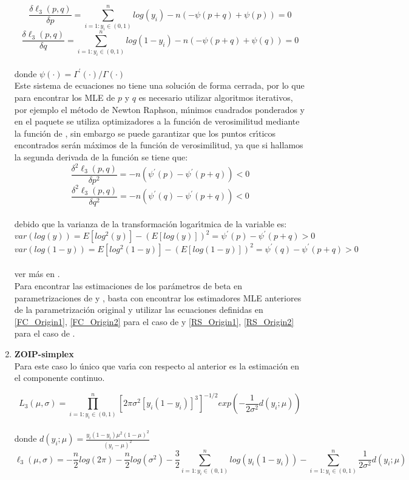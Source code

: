 \begin{enumerate}
\[
\frac{\delta \ell_3(p,q)}{\delta p}=\sum_{i=1:y_i \in (0,1)}^{n}{log(y_i)}-n(-\psi(p+q)+\psi(p))=0
\]
\[
\frac{\delta \ell_3(p,q)}{\delta q}=\sum_{i=1:y_i \in (0,1)}^{n}{log(1-y_i)}-n(-\psi(p+q)+\psi(q))=0
\]
\\
donde $\psi(\cdot)={\Gamma^{'}{(\cdot)}}/{\Gamma(\cdot)}$
\\
Este sistema de ecuaciones no tiene una soluci\'{o}n de forma cerrada, por lo que para encontrar los MLE de $p$ y $q$ es necesario utilizar algoritmos iterativos, por ejemplo el m\'{e}todo de Newton Raphson, m\'{\i}nimos cuadrados ponderados y en el paquete  se utiliza optimizadores a la funci\'{o}n de verosimilitud mediante la funci\'{o}n  de , sin embargo se puede garantizar que los puntos cr\'{\i}ticos encontrados ser\'{a}n m\'{a}ximos de la funci\'{o}n de verosimilitud, ya que si hallamos la segunda derivada de la funci\'{o}n se tiene que:
\[
\frac{\delta^2 \ell_3(p,q)}{\delta p^2}=-n(\psi^{'}(p)-\psi^{'}(p+q))<0
\]
\[
\frac{\delta^2 \ell_3(p,q)}{\delta q^2}=-n(\psi^{'}(q)-\psi^{'}(p+q))<0
\]
\\
debido que la varianza de la transformaci\'{o}n logar\'{\i}tmica de la variable es:
\[
var(log(y))=E[log^2(y)]-(E[log(y)])^2=\psi^{'}(p)-\psi^{'}(p+q)>0
\]
\[
var(log(1-y))=E[log^2(1-y)]-(E[log(1-y)])^2=\psi^{'}(q)-\psi^{'}(p+q)>0
\]
\\
ver m\'{a}s en \cite{Owen1}.\\

Para encontrar las estimaciones de los par\'{a}metros de beta en parametrizaciones de \cite{Ferrari2} y \cite{Stasinopoulos2}, basta con encontrar los estimadores MLE anteriores de la parametrizaci\'{o}n original y utilizar las ecuaciones definidas en \eqref{FC_Origin1}, \eqref{FC_Origin2} para el caso de \cite{Ferrari2} y \eqref{RS_Origin1}, \eqref{RS_Origin2} para el caso de \cite{Stasinopoulos2}.

\item \textbf{ZOIP-simplex}\\

Para este caso lo \'{u}nico que var\'{\i}a con respecto al anterior es la estimaci\'{o}n en el componente continuo.

\[
L_3(\mu,\sigma)=\prod_{i=1:y_i \in (0,1)}^{n}\left[{2\pi \sigma^{2}[y_i(1-y_i)]^{3}}\right]^{-1/2}exp\left(-\frac{1}{2\sigma^2}d(y_i;\mu)\right)
\]
\\
donde $d(y_i ;\mu)=\frac{y_i(1-y_i)\mu^2(1-\mu)^2}{(y_i-\mu)^2}$
\[
\ell_3(\mu,\sigma)=-\frac{n}{2}log(2\pi)-\frac{n}{2}log(\sigma^2)-\frac{3}{2}\sum_{i=1:y_i \in (0,1)}^{n}{log(y_i(1-y_i))}-\sum_{i=1:y_i \in (0,1)}^{n}{\frac{1}{2\sigma^2}d(y_i;\mu)}
\]


\end{enumerate}
